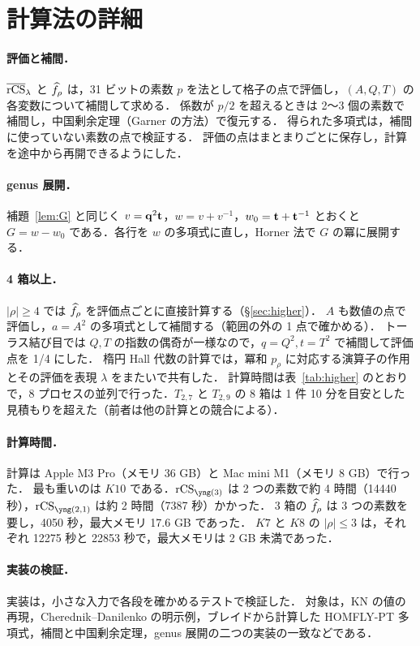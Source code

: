 \section{計算法の詳細}\label{app:computation}
\paragraph{評価と補間．}
$\overline{\textrm{rCS}}_\lambda$ と $\widehat{f}_\rho$ は，31 ビットの素数 $p$ を法として格子の点で評価し，$(A,Q,T)$ の各変数について補間して求める．
係数が $p/2$ を超えるときは 2〜3 個の素数で補間し，中国剰余定理（Garner の方法）で復元する．
得られた多項式は，補間に使っていない素数の点で検証する．
評価の点はまとまりごとに保存し，計算を途中から再開できるようにした．
\paragraph{genus 展開．}
補題~\ref{lem:G} と同じく $v=\mathbf{q}^2\mathbf{t}$，$w=v+v^{-1}$，$w_0=\mathbf{t}+\mathbf{t}^{-1}$ とおくと $G=w-w_0$ である．各行を $w$ の多項式に直し，Horner 法で $G$ の冪に展開する．
\paragraph{4 箱以上．}
$|\rho|\ge4$ では $\widehat{f}_\rho$ を評価点ごとに直接計算する（\S\ref{sec:higher}）．
$A$ も数値の点で評価し，$a=A^2$ の多項式として補間する（範囲の外の 1 点で確かめる）．
トーラス結び目では $Q,T$ の指数の偶奇が一様なので，$q=Q^2,t=T^2$ で補間して評価点を 1/4 にした．
楕円 Hall 代数の計算では，冪和 $p_\rho$ に対応する演算子の作用とその評価を表現 $\lambda$ をまたいで共有した．
計算時間は表~\ref{tab:higher} のとおりで，8 プロセスの並列で行った．$T_{2,7}$ と $T_{2,9}$ の 8 箱は 1 件 10 分を目安とした見積もりを超えた（前者は他の計算との競合による）．
\paragraph{計算時間．}
計算は Apple M3 Pro（メモリ 36 GB）と Mac mini M1（メモリ 8 GB）で行った．
最も重いのは $K10$ である．$\rCS_{\yng(3)}$ は 2 つの素数で約 4 時間（14440 秒），$\rCS_{\yng(2,1)}$ は約 2 時間（7387 秒）かかった．
3 箱の $\widehat f_\rho$ は 3 つの素数を要し，4050 秒，最大メモリ 17.6 GB であった．
$K7$ と $K8$ の $|\rho|\le3$ は，それぞれ 12275 秒と 22853 秒で，最大メモリは 2 GB 未満であった．
\paragraph{実装の検証．}
実装は，小さな入力で各段を確かめるテストで検証した．
対象は，KN の値の再現，Cherednik--Danilenko の明示例，ブレイドから計算した HOMFLY-PT 多項式，補間と中国剰余定理，genus 展開の二つの実装の一致などである．


